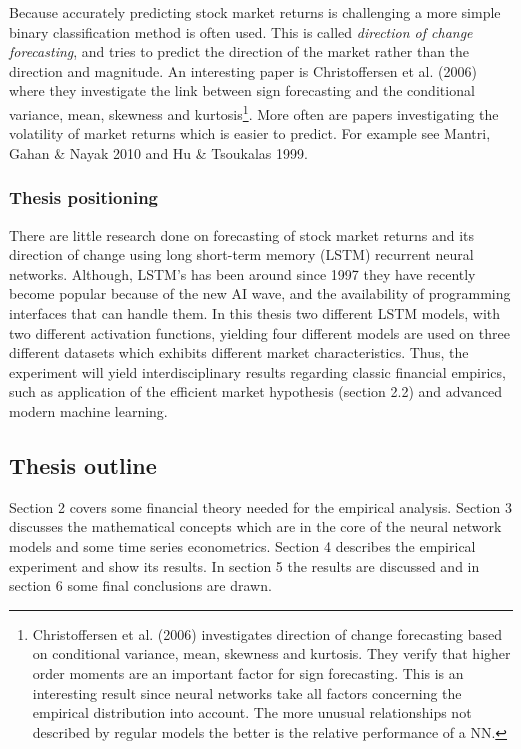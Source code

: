 \documentclass[12pt, letterpaper]{amsart}%
\begin{document}
Because accurately predicting stock market returns is challenging a more simple binary classification method is often used. This is called \textit{direction of change forecasting}, and tries to predict the direction of the market rather than the direction and magnitude. An interesting paper is Christoffersen et al. (2006) where they investigate the link between sign forecasting and the conditional variance, mean, skewness and kurtosis\footnote{Christoffersen et al. (2006) investigates direction of change forecasting based on conditional variance, mean, skewness and kurtosis. They verify that higher order moments are an important factor for sign forecasting. This is an interesting result since neural networks take all factors concerning the empirical distribution into account. The more unusual relationships not described by regular models the better is the relative performance of a NN.}. More often are papers investigating the volatility of market returns which is easier to predict. For example see Mantri, Gahan \& Nayak 2010 and Hu \& Tsoukalas 1999.

\subsubsection{Thesis positioning}
There are little research done on forecasting of stock market returns and its direction of change using long short-term memory (LSTM) recurrent neural networks. Although, LSTM's has been around since 1997 they have recently become popular because of the new AI wave, and the availability of programming interfaces that can handle them. In this thesis two different LSTM models, with two different activation functions, yielding four different models are used on three different datasets which exhibits different market characteristics. Thus, the experiment will yield interdisciplinary results regarding classic financial empirics, such as application of the efficient market hypothesis (section 2.2) and advanced modern machine learning.

\subsection{Thesis outline}
Section 2 covers some financial theory needed for the empirical analysis. Section 3 discusses the mathematical concepts which are in the core of the neural network models and some time series econometrics. Section 4 describes the empirical experiment and show its results. In section 5 the results are discussed and in section 6 some final conclusions are drawn.
\end{document}
